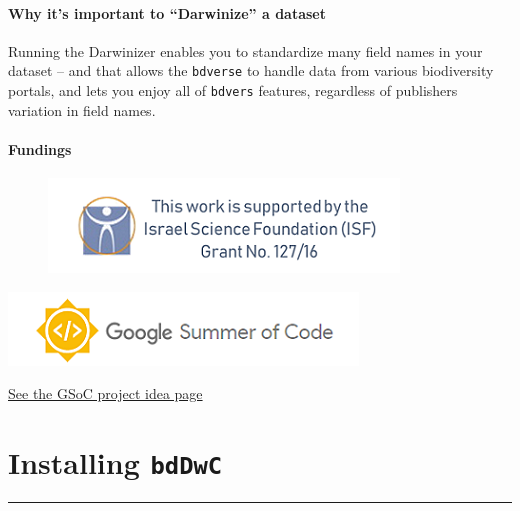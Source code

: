 \documentclass[]{book}
\theoremstyle{definition}
\theoremstyle{definition}
\theoremstyle{definition}
\theoremstyle{remark}
\begin{document}
\subsubsection*{\texorpdfstring{Why it's important to ``Darwinize'' a
dataset}{Why it's important to Darwinize a dataset}}\label{why-its-important-to-darwinize-a-dataset}

Running the Darwinizer enables you to standardize many field names in
your dataset -- and that allows the \texttt{bdverse} to handle data from
various biodiversity portals, and lets you enjoy all of \texttt{bdvers}
features, regardless of publishers variation in field names.

\subsubsection*{Fundings}\label{fundings}

\begin{figure}
\centering
\includegraphics{img/ISF.png}
\caption{}
\end{figure}

\href{https://summerofcode.withgoogle.com/\%20target=\%22_blank\%22}{\includegraphics{img/GSoC.png}}

\href{https://github.com/rstats-gsoc/gsoc2018/wiki/Darwinazing-biodiversity-data-in-R\%20target=\%22_blank\%22}{See
the GSoC project idea page}

\chapter{\texorpdfstring{Installing
\texttt{bdDwC}}{Installing bdDwC}}\label{installing-bddwc}

\begin{center}\rule{0.5\linewidth}{\linethickness}\end{center}
\end{document}
